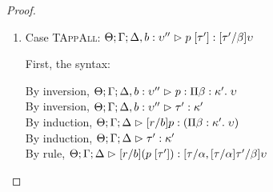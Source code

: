 \begin{proof}
\begin{enumerate}
  For semantics, consider $\interp{\judgeA[\Theta; \Gamma; \Delta]{[r/b](p\;q)}{\upsilon}}\;\theta\;\gamma\;\delta$
  \begin{eqnproof}
    {Semantics}
    {Induction}
          {Semantics}
  \end{eqnproof}


\item Case \textsc{TAppAll}: $\judgeA[\Theta; \Gamma; \Delta, b:\upsilon'']{p\;[\tau']}{[\tau'/\beta]\upsilon}$
  
  First, the syntax:
  \begin{tabbedproof}
    \oo By inversion, $\judgeA[\Theta; \Gamma; \Delta, b:\upsilon'']{p}{\forallsort{\beta}{\kappa'}{\upsilon}}$\\
    \oo By inversion, $\judgeA[\Theta; \Gamma; \Delta, b:\upsilon'']{\tau'}{\kappa'}$\\
    \oo By induction, $\judgeA[\Theta; \Gamma; \Delta]{[r/b]p}{(\forallsort{\beta}{\kappa'}{\upsilon})}$\\
    \oo By induction, $\judgeA[\Theta; \Gamma; \Delta]{\tau'}{\kappa'}$\\
    \oo By rule, $\judgeA[\Theta; \Gamma; \Delta]{[r/b](p\;[\tau'])}{{[\tau/\alpha, [\tau/\alpha]\tau'/\beta]}\upsilon}$\\
  \end{tabbedproof}


\end{enumerate}
\end{proof}
